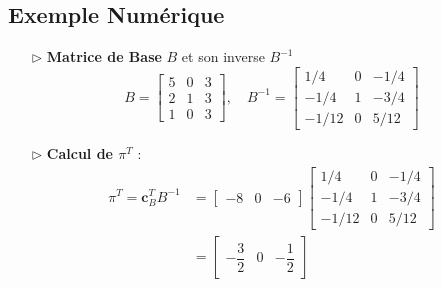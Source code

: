 \documentclass{report}
\begin{document}
\begin{multicols*}{2}
\subsection{Exemple Numérique}

\begin{itemize}
    \item[$\rhd$] \textbf{Matrice de Base} \( B \) et son inverse \( B^{-1} \)
    \[
    B = 
    \begin{bmatrix}
    5 & 0 & 3 \\
    2 & 1 & 3 \\
    1 & 0 & 3
    \end{bmatrix}, \quad
    B^{-1} = 
    \begin{bmatrix}
    1/4 & 0 & -1/4 \\
    -1/4 & 1 & -3/4 \\
    -1/12 & 0 & 5/12
    \end{bmatrix}
    \]
    \item[$\rhd$] \textbf{Calcul de \( \pi^T \)} :
    \begin{align*}
        \pi^T = \mathbf{c}_B^T B^{-1} &= 
    \begin{bmatrix}
    -8 & 0 & -6
    \end{bmatrix}
    \begin{bmatrix}
    1/4 & 0 & -1/4 \\
    -1/4 & 1 & -3/4 \\
    -1/12 & 0 & 5/12
    \end{bmatrix} 
    \\
                                      &= 
    \begin{bmatrix}
    -\dfrac{3}{2} & 0 & -\dfrac{1}{2}
    \end{bmatrix}               
    \end{align*}
    


\end{itemize}
\end{multicols*}
\end{document}
